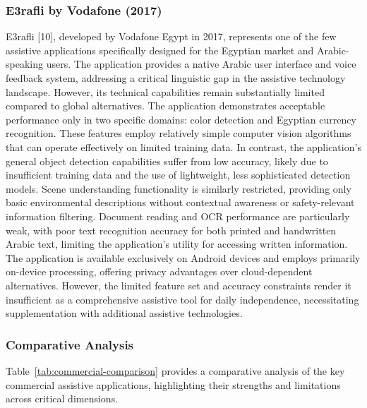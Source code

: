 \documentclass[a4paper]{report}
\begin{document}
\subsubsection{E3rafli by Vodafone (2017)}

E3rafli [10], developed by Vodafone Egypt in 2017, represents one of the few assistive applications specifically designed for the Egyptian market and Arabic-speaking users. The application provides a native Arabic user interface and voice feedback system, addressing a critical linguistic gap in the assistive technology landscape. However, its technical capabilities remain substantially limited compared to global alternatives. The application demonstrates acceptable performance only in two specific domains: color detection and Egyptian currency recognition. These features employ relatively simple computer vision algorithms that can operate effectively on limited training data. In contrast, the application's general object detection capabilities suffer from low accuracy, likely due to insufficient training data and the use of lightweight, less sophisticated detection models. Scene understanding functionality is similarly restricted, providing only basic environmental descriptions without contextual awareness or safety-relevant information filtering. Document reading and OCR performance are particularly weak, with poor text recognition accuracy for both printed and handwritten Arabic text, limiting the application's utility for accessing written information. The application is available exclusively on Android devices and employs primarily on-device processing, offering privacy advantages over cloud-dependent alternatives. However, the limited feature set and accuracy constraints render it insufficient as a comprehensive assistive tool for daily independence, necessitating supplementation with additional assistive technologies.

\subsubsection{Comparative Analysis}

Table~\ref{tab:commercial-comparison} provides a comparative analysis of the key commercial assistive applications, highlighting their strengths and limitations across critical dimensions.
\end{document}

